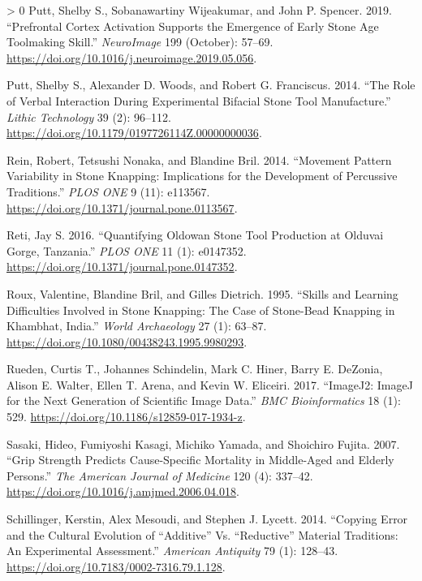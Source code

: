 \documentclass[smallextended]{svjour3}       %
\newlength{\cslhangindent}
\newenvironment{CSLReferences}[3] %
 {%
  \setlength{\parindent}{0pt}
  \ifodd #1 \everypar{\setlength{\hangindent}{\cslhangindent}}\ignorespaces\fi
  \ifnum #2 > 0
  \setlength{\parskip}{#3\baselineskip}
  \fi
 }%
 {}
\begin{document}
\begin{CSLReferences}{1}{0}
\leavevmode\hypertarget{ref-putt2019}{}%
Putt, Shelby S., Sobanawartiny Wijeakumar, and John P. Spencer. 2019.
{``Prefrontal Cortex Activation Supports the Emergence of Early Stone
Age Toolmaking Skill.''} \emph{NeuroImage} 199 (October): 57--69.
\url{https://doi.org/10.1016/j.neuroimage.2019.05.056}.

\leavevmode\hypertarget{ref-putt2014}{}%
Putt, Shelby S., Alexander D. Woods, and Robert G. Franciscus. 2014.
{``The Role of Verbal Interaction During Experimental Bifacial Stone
Tool Manufacture.''} \emph{Lithic Technology} 39 (2): 96--112.
\url{https://doi.org/10.1179/0197726114Z.00000000036}.

\leavevmode\hypertarget{ref-rein2014}{}%
Rein, Robert, Tetsushi Nonaka, and Blandine Bril. 2014. {``Movement
Pattern Variability in Stone Knapping: Implications for the Development
of Percussive Traditions.''} \emph{PLOS ONE} 9 (11): e113567.
\url{https://doi.org/10.1371/journal.pone.0113567}.

\leavevmode\hypertarget{ref-reti2016}{}%
Reti, Jay S. 2016. {``Quantifying Oldowan Stone Tool Production at
Olduvai Gorge, Tanzania.''} \emph{PLOS ONE} 11 (1): e0147352.
\url{https://doi.org/10.1371/journal.pone.0147352}.

\leavevmode\hypertarget{ref-roux1995}{}%
Roux, Valentine, Blandine Bril, and Gilles Dietrich. 1995. {``Skills and
Learning Difficulties Involved in Stone Knapping: The Case of
Stone{-}Bead Knapping in Khambhat, India.''} \emph{World Archaeology} 27
(1): 63--87. \url{https://doi.org/10.1080/00438243.1995.9980293}.

\leavevmode\hypertarget{ref-rueden2017}{}%
Rueden, Curtis T., Johannes Schindelin, Mark C. Hiner, Barry E. DeZonia,
Alison E. Walter, Ellen T. Arena, and Kevin W. Eliceiri. 2017.
{``ImageJ2: ImageJ for the Next Generation of Scientific Image Data.''}
\emph{BMC Bioinformatics} 18 (1): 529.
\url{https://doi.org/10.1186/s12859-017-1934-z}.

\leavevmode\hypertarget{ref-sasaki2007}{}%
Sasaki, Hideo, Fumiyoshi Kasagi, Michiko Yamada, and Shoichiro Fujita.
2007. {``Grip Strength Predicts Cause-Specific Mortality in Middle-Aged
and Elderly Persons.''} \emph{The American Journal of Medicine} 120 (4):
337--42. \url{https://doi.org/10.1016/j.amjmed.2006.04.018}.

\leavevmode\hypertarget{ref-schillinger2014}{}%
Schillinger, Kerstin, Alex Mesoudi, and Stephen J. Lycett. 2014.
{``Copying Error and the Cultural Evolution of {``}Additive{''} Vs.
{``}Reductive{''} Material Traditions: An Experimental Assessment.''}
\emph{American Antiquity} 79 (1): 128--43.
\url{https://doi.org/10.7183/0002-7316.79.1.128}.


\end{CSLReferences}
\end{document}

